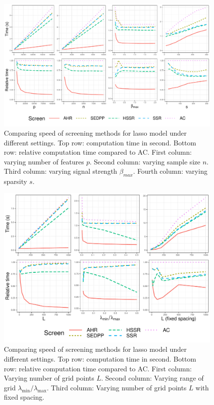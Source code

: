 \begin{figure}[h]
    \centering
    \includegraphics[scale = 0.59]{plots/511.pdf}    \caption{Comparing speed of screening methods for lasso model under different settings. Top row: computation time in second. Bottom row: relative computation time compared to AC. First column: varying number of features $p$. Second column: varying sample size $n$. Third column: varying signal strength $\beta_{max}$. Fourth column: varying sparsity $s$.}
    \label{fig:5.1.1a}
\end{figure}

\begin{figure}[h]
    \centering
    \includegraphics[scale = 0.59]{plots/511b.pdf}    \caption{Comparing speed of screening methods for lasso model under different settings. Top row: computation time in second. Bottom row: relative computation time compared to AC. First column: Varying number of grid points $L$. Second column: Varying range of grid $\lambda_{\min}/\lambda_{\max}$. Third column: Varying number of grid points $L$ with fixed spacing.}
    \label{fig:5.1.1b}
\end{figure}

